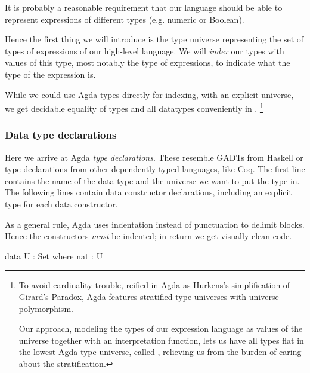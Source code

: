 It is probably a reasonable requirement that our language should be able to represent
expressions of different types (e.g. numeric or Boolean).

Hence the first thing we will introduce is the type universe representing the set of
types of expressions of our high-level language. We will \emph{index} our types with
values of this type, most notably the type  of expressions, to
indicate what the type of the expression is.

While we could use Agda
types directly for indexing, with an explicit universe, we get decidable
equality of types and all datatypes conveniently in .%
\footnote{To avoid cardinality trouble, reified in Agda as Hurkens's
simplification\cite{hurkens} of Girard's Paradox\cite{girard:dissertation},
Agda features stratified type universes with universe polymorphism.

Our approach, modeling the types of our expression language as values
of the universe  together with an interpretation function,
lets us have all types flat in the lowest Agda type
universe, called , relieving us from the burden of caring about the
stratification.}


\subsubsection{Data type declarations}

Here we arrive at Agda \emph{type declarations}. These resemble GADTs from
Haskell or type declarations from other dependently typed languages, like Coq.
The first line contains the name of the data type and the universe we want to
put the type in. The following lines contain data constructor declarations,
including an explicit type for each data constructor.

As a general rule, Agda uses indentation instead of punctuation to delimit
blocks. Hence the constructors \emph{must} be indented; in return we get
visually clean code.

\begin{code}
  data U : Set where
    nat : U
\end{code}

